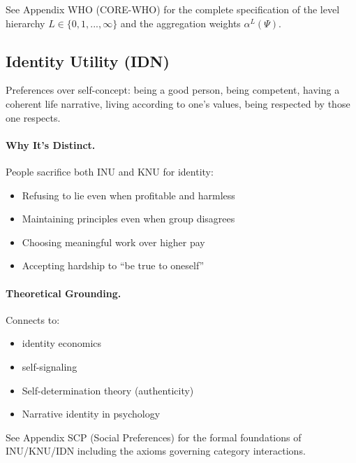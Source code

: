 \begin{cross-reference}
See Appendix WHO (CORE-WHO) for the complete specification of the level hierarchy
$L \in \{0, 1, ..., \infty\}$ and the aggregation weights $\alpha^L(\Psi)$.
\end{cross-reference}

\subsection{Identity Utility (IDN)}
\label{sec:fepsde-idn}

\begin{definition}
Preferences over self-concept: being a good person, being competent,
having a coherent life narrative, living according to one's values,
being respected by those one respects.
\end{definition}

\paragraph{Why It's Distinct.}
People sacrifice both INU and KNU for identity:
\begin{itemize}[nosep]
  \item Refusing to lie even when profitable and harmless
  \item Maintaining principles even when group disagrees
  \item Choosing meaningful work over higher pay
  \item Accepting hardship to ``be true to oneself''
\end{itemize}

\paragraph{Theoretical Grounding.}
Connects to:
\begin{itemize}[nosep]
  \item \citet{akerlofkranton} identity economics
  \item \citet{benaboutirole} self-signaling
  \item Self-determination theory (authenticity)
  \item Narrative identity in psychology
\end{itemize}

\begin{cross-reference}
See Appendix SCP (Social Preferences) for the formal foundations of
INU/KNU/IDN including the axioms governing category interactions.
\end{cross-reference}


